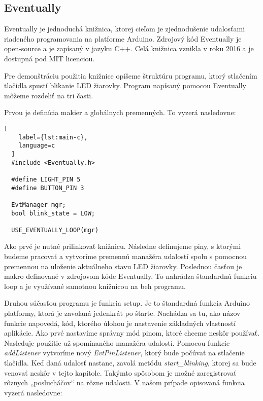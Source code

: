 \subsection{Eventually}
\noindent \par
Eventually je jednoduchá knižnica, ktorej cieľom je zjednodušenie udalosťami riadeného
programovania na platforme Arduino. Zdrojový kód Eventually je open-source a je zapísaný v jazyku C++. Celá knižnica vznikla v roku 2016 a je dostupná pod \acrshort{MIT} licenciou.
\par Pre demonštráciu použitia knižnice opíšeme štruktúru programu, ktorý stlačením tlačidla spustí blikanie LED žiarovky. Program napísaný pomocou Eventually môžeme rozdeliť na tri časti.

\par Prvou je definícia makier a globálnych premenných. To vyzerá nasledovne:
\begin{lstlisting}[
    label={lst:main-c},
    language=c
  ]  
  #include <Eventually.h>

  #define LIGHT_PIN 5
  #define BUTTON_PIN 3
  
  EvtManager mgr;
  bool blink_state = LOW;

  USE_EVENTUALLY_LOOP(mgr)
\end{lstlisting}

Ako prvé je nutné prilinkovať knižnicu. Následne definujeme piny, s ktorými budeme pracovať a vytvoríme premennú manažéra udalostí spolu s pomocnou premennou na uloženie aktuálneho stavu LED žiarovky. Poslednou časťou je makro definované v zdrojovom kóde Eventually. To nahrádza štandardnú funkciu loop a je využívané samotnou knižnicou na beh programu.

\par Druhou súčasťou programu je funkcia setup. Je to štandardná funkcia Arduino platformy, ktorá je zavolaná
jedenkrát po štarte. Nachádza sa tu, ako názov funkcie napovedá, kód, ktorého úlohou je
nastavenie základných vlastností aplikácie. Ako prvé nastavíme správny mód pinom, ktoré chceme neskôr používať. Nasleduje použitie už
spomínaného manažéra udalostí. Pomocou funkcie \textit{addListener} vytvoríme nový \textit{EvtPinListener}, ktorý bude počúvať na stlačenie tlačidla.
Keď daná udalosť nastane, zavolá metódu \textit{start\_blinking}, ktorej sa bude venovať neskôr v tejto kapitole.
Takýmto spôsobom je možné zaregistrovať rôznych  „poslucháčov“  na rôzne udalosti. V našom prípade opisovaná funkcia vyzerá nasledovne:

